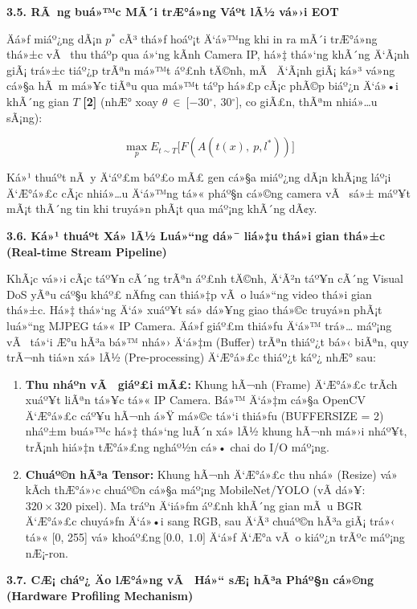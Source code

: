 \documentclass[]{article}
\begin{document}
\textbf{3.5. RÃ ng buá»™c MÃ´i trÆ°á»ng Váº­t lÃ½ vá»›i EOT}

Äá»ƒ miáº¿ng dÃ¡n \(p^{*}\) cÃ³ thá»ƒ hoáº¡t Ä‘á»™ng khi in ra mÃ´i trÆ°á»ng thá»±c vÃ  thu
tháº­p qua á»‘ng kÃ­nh Camera IP, há»‡ thá»‘ng khÃ´ng Ä‘Ã¡nh giÃ¡ trá»±c tiáº¿p trÃªn má»™t
áº£nh tÄ©nh, mÃ  Ä‘Ã¡nh giÃ¡ ká»³ vá»ng cá»§a hÃ m má»¥c tiÃªu qua má»™t táº­p há»£p cÃ¡c phÃ©p
biáº¿n Ä‘á»•i khÃ´ng gian \(T\) \textbf{{[}2{]}} (nhÆ° xoay
\(\theta\  \in \ \lbrack - 30{^\circ},\ 30{^\circ}\rbrack\), co giÃ£n,
thÃªm nhiá»…u sÃ¡ng):

\[\max_{p}E_{t\sim T}\lbrack F(A(t(x),\ p,l^{*}))\rbrack\]

Ká»¹ thuáº­t nÃ y Ä‘áº£m báº£o mÃ£ gen cá»§a miáº¿ng dÃ¡n khÃ¡ng láº¡i Ä‘Æ°á»£c cÃ¡c nhiá»…u Ä‘á»™ng
tá»« pháº§n cá»©ng camera vÃ  sá»± máº¥t mÃ¡t thÃ´ng tin khi truyá»n phÃ¡t qua máº¡ng
khÃ´ng dÃ¢y.\textbf{\hfill\break
}

\textbf{3.6. Ká»¹ thuáº­t Xá»­ lÃ½ Luá»“ng dá»¯ liá»‡u thá»i gian thá»±c (Real-time
Stream Pipeline)}

KhÃ¡c vá»›i cÃ¡c táº¥n cÃ´ng trÃªn áº£nh tÄ©nh, Ä‘Ã²n táº¥n cÃ´ng Visual DoS yÃªu
cáº§u kháº£ nÄƒng can thiá»‡p vÃ o luá»“ng video thá»i gian thá»±c. Há»‡ thá»‘ng Ä‘á» xuáº¥t
sá»­ dá»¥ng giao thá»©c truyá»n phÃ¡t luá»“ng MJPEG tá»« IP Camera. Äá»ƒ giáº£m thiá»ƒu Ä‘á»™
trá»… máº¡ng vÃ  tá»‘i Æ°u hÃ³a bá»™ nhá»› Ä‘á»‡m (Buffer) trÃªn thiáº¿t bá»‹ biÃªn, quy trÃ¬nh
tiá»n xá»­ lÃ½ (Pre-processing) Ä‘Æ°á»£c thiáº¿t káº¿ nhÆ° sau:

\begin{enumerate}
\def\labelenumi{\arabic{enumi}.}
\item
  \textbf{Thu nháº­n vÃ  giáº£i mÃ£:} Khung hÃ¬nh (Frame) Ä‘Æ°á»£c trÃ­ch xuáº¥t liÃªn
  tá»¥c tá»« IP Camera. Bá»™ Ä‘á»‡m cá»§a OpenCV Ä‘Æ°á»£c cáº¥u hÃ¬nh á»Ÿ má»©c tá»‘i thiá»ƒu
  (BUFFERSIZE = 2) nháº±m buá»™c há»‡ thá»‘ng luÃ´n xá»­ lÃ½ khung hÃ¬nh má»›i nháº¥t,
  trÃ¡nh hiá»‡n tÆ°á»£ng ngháº½n cá»• chai do I/O máº¡ng.
\item
  \textbf{Chuáº©n hÃ³a Tensor:} Khung hÃ¬nh Ä‘Æ°á»£c thu nhá» (Resize) vá» kÃ­ch
  thÆ°á»›c chuáº©n cá»§a máº¡ng MobileNet/YOLO (vÃ­ dá»¥: \(320 \times 320\) pixel).
  Ma tráº­n Ä‘iá»ƒm áº£nh khÃ´ng gian mÃ u BGR Ä‘Æ°á»£c chuyá»ƒn Ä‘á»•i sang RGB, sau Ä‘Ã³
  chuáº©n hÃ³a giÃ¡ trá»‹ tá»« {[}0, 255{]} vá»
  khoáº£ng\(\ \lbrack 0.0,\ 1.0\rbrack\) Ä‘á»ƒ Ä‘Æ°a vÃ o kiáº¿n trÃºc máº¡ng nÆ¡-ron.
\end{enumerate}

\textbf{3.7. CÆ¡ cháº¿ Äo lÆ°á»ng vÃ  Há»“ sÆ¡ hÃ³a Pháº§n cá»©ng (Hardware Profiling
Mechanism)}
\end{document}

